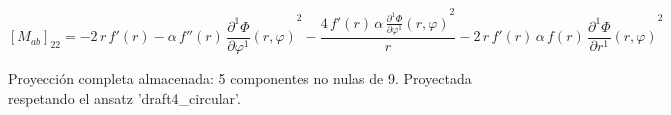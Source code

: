 \documentclass[11pt]{article}
\begin{document}
\par\smallskip
\begin{dmath*}[breakdepth={5}]
\left[M_{ab}\right]_{22} = -2\,r\,f'\!\left(r\right) - \alpha\,f''\!\left(r\right)\,{\frac{\partial^{1} \Phi}{\partial \varphi^{1}}\!\left(r, \varphi\right)}^{2} - \frac{4\,f'\!\left(r\right)\,\alpha\,{\frac{\partial^{1} \Phi}{\partial \varphi^{1}}\!\left(r, \varphi\right)}^{2}}{r} - 2\,r\,f'\!\left(r\right)\,\alpha\,f\!\left(r\right)\,{\frac{\partial^{1} \Phi}{\partial r^{1}}\!\left(r, \varphi\right)}^{2}
\end{dmath*}
\par\smallskip
Proyección completa almacenada: 5 componentes no nulas de 9. Proyectada respetando el ansatz 'draft4\_circular'.\par\medskip
{}
\end{document}
